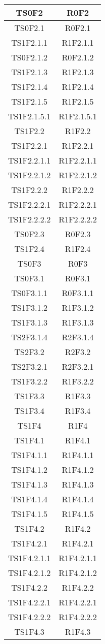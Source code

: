 \begin{longtable}{|c|c|}
    	TS0F2&R0F2 \\ \hline
    	TS0F2.1&R0F2.1 \\ \hline
    	TS1F2.1.1&R1F2.1.1 \\ \hline
    	TS0F2.1.2&R0F2.1.2 \\ \hline
    	TS1F2.1.3&R1F2.1.3 \\ \hline
    	TS1F2.1.4&R1F2.1.4 \\ \hline
    	TS1F2.1.5&R1F2.1.5 \\ \hline
    	TS1F2.1.5.1&R1F2.1.5.1 \\ \hline
    	TS1F2.2&R1F2.2 \\ \hline
    	TS1F2.2.1&R1F2.2.1 \\ \hline
    	TS1F2.2.1.1&R1F2.2.1.1 \\ \hline
    	TS1F2.2.1.2&R1F2.2.1.2 \\ \hline
    	TS1F2.2.2&R1F2.2.2 \\ \hline
    	TS1F2.2.2.1&R1F2.2.2.1 \\ \hline
    	TS1F2.2.2.2&R1F2.2.2.2 \\ \hline
    	TS0F2.3&R0F2.3 \\ \hline
    	TS1F2.4&R1F2.4 \\ \hline
    	TS0F3&R0F3 \\ \hline
    	TS0F3.1&R0F3.1 \\ \hline
    	TS0F3.1.1&	R0F3.1.1 \\ \hline
    	TS1F3.1.2&R1F3.1.2 \\ \hline
    	TS1F3.1.3&R1F3.1.3 \\ \hline
    	TS2F3.1.4&R2F3.1.4 \\ \hline
    	TS2F3.2&R2F3.2 \\ \hline
    	TS2F3.2.1&R2F3.2.1 \\ \hline
    	TS1F3.2.2&R1F3.2.2 \\ \hline
    	TS1F3.3&R1F3.3 \\ \hline
    	TS1F3.4&R1F3.4\\ \hline
    	TS1F4&R1F4 \\ \hline
    	TS1F4.1&R1F4.1 \\ \hline
    	TS1F4.1.1&R1F4.1.1 \\ \hline
    	TS1F4.1.2&R1F4.1.2 \\ \hline
    	TS1F4.1.3&R1F4.1.3 \\ \hline
    	TS1F4.1.4&R1F4.1.4 \\ \hline
    	TS1F4.1.5&R1F4.1.5 \\ \hline
    	TS1F4.2&R1F4.2 \\ \hline
    	TS1F4.2.1&R1F4.2.1 \\ \hline
    	TS1F4.2.1.1&R1F4.2.1.1 \\ \hline
    	TS1F4.2.1.2&R1F4.2.1.2 \\ \hline
    	TS1F4.2.2&R1F4.2.2 \\ \hline
    	TS1F4.2.2.1&R1F4.2.2.1 \\ \hline
    	TS1F4.2.2.2&R1F4.2.2.2 \\ \hline
    	TS1F4.3&R1F4.3 \\ \hline
    	

\end{longtable}

